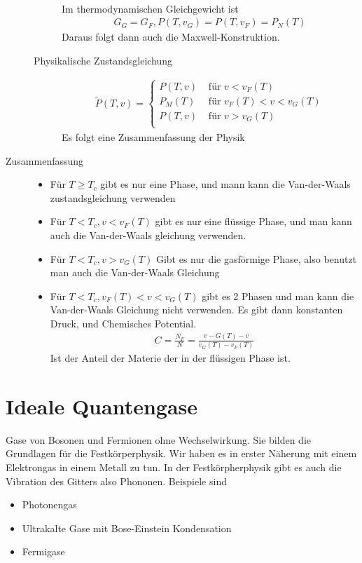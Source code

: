 \begin{description}
\begin{description}
\begin{align*}
       \end{align*}
       Im thermodynamischen Gleichgewicht ist
       \begin{align*}
         G_G = G_F, P(T, v_G) = P(T, v_F) = P_N (T)
       \end{align*}
       Daraus folgt dann auch die Maxwell-Konstruktion.
     \item[Physikalische Zustandsgleichung]
       \begin{align*}
         \tilde{P}(T, v) = \begin{cases}
           P(T, v) & \text{ f\"ur } v < v_F(T) \\
           P_M(T) & \text{ f\"ur } v_F(T) < v < v_G(T) \\
           P(T, v) & \text{ f\"ur } v > v_G(T) \\
         \end{cases} 
       \end{align*}
      Es folgt eine Zusammenfassung der Physik
    \end{description}
  \item[Zusammenfassung]
    \begin{itemize}
      \item F\"ur $T \ge T_c$ gibt es nur eine Phase, und mann kann
        die Van-der-Waals zustandsgleichung verwenden
      \item F\"ur $T < T_c, v < v_F(T)$ gibt es nur eine fl\"ussige Phase, 
        und man kann auch die Van-der-Waals gleichung verwenden.
      \item F\"ur $T < T_c, v > v_G(T)$ Gibt es nur die gasf\"ormige Phase, also
        benutzt man auch die Van-der-Waals Gleichung
      \item F\"ur $T < T_c, v_F(T) < v < v_G(T)$ gibt es 2 Phasen und man kann
        die Van-der-Waals Gleichung nicht verwenden. Es gibt dann konstanten
        Druck, und Chemisches Potential.
        \begin{align*}
          C = \frac{N_F}{N} = \frac{v-G(T) - v}{v_G(T) - v_F(T)}
        \end{align*}
        Ist der Anteil der Materie der in der fl\"ussigen Phase ist.
    \end{itemize}
\end{description}


\section*{Ideale Quantengase}
Gase von Bosonen und Fermionen ohne Wechselwirkung.
Sie bilden die Grundlagen f\"ur die Festk\"orperphysik. Wir haben es
in erster N\"aherung mit einem Elektrongas in einem Metall zu tun. In der 
Festk\"orpherphysik gibt es auch die Vibration des Gitters also Phononen.
Beispiele sind 
\begin{itemize}
  \item Photonengas
  \item Ultrakalte Gase mit Bose-Einstein Kondensation
  \item Fermigase
\end{itemize}
